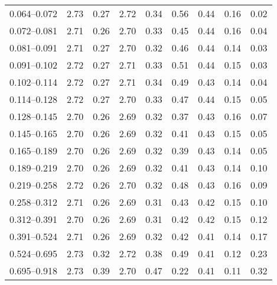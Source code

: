 \begin{table}
\begin{center}
{\begin{tabular}{@{}l l l l l l l l l@{}}
                0.064--0.072    &  2.73   &  0.27   &  2.72         &  0.34      &  0.56    &  0.44  &  0.16       &  0.02  \\
                0.072--0.081    &  2.71   &  0.26   &  2.70         &  0.33      &  0.45    &  0.44  &  0.16       &  0.04  \\
                0.081--0.091    &  2.71   &  0.27   &  2.70         &  0.32      &  0.46    &  0.44  &  0.14       &  0.03  \\
                0.091--0.102    &  2.72   &  0.27   &  2.71         &  0.33      &  0.51    &  0.44  &  0.15       &  0.03  \\
                0.102--0.114    &  2.72   &  0.27   &  2.71         &  0.34      &  0.49    &  0.43  &  0.14       &  0.04  \\
                0.114--0.128    &  2.72   &  0.27   &  2.70         &  0.33      &  0.47    &  0.44  &  0.15       &  0.05  \\
                0.128--0.145    &  2.70   &  0.26   &  2.69         &  0.32      &  0.37    &  0.43  &  0.16       &  0.07  \\
                0.145--0.165    &  2.70   &  0.26   &  2.69         &  0.32      &  0.41    &  0.43  &  0.15       &  0.05  \\
                0.165--0.189    &  2.70   &  0.26   &  2.69         &  0.32      &  0.39    &  0.43  &  0.14       &  0.05  \\
                0.189--0.219    &  2.70   &  0.26   &  2.69         &  0.32      &  0.41    &  0.43  &  0.14       &  0.10  \\
                0.219--0.258    &  2.72   &  0.26   &  2.70         &  0.32      &  0.48    &  0.43  &  0.16       &  0.09  \\
                0.258--0.312    &  2.71   &  0.26   &  2.69         &  0.31      &  0.43    &  0.42  &  0.15       &  0.10  \\
                0.312--0.391    &  2.70   &  0.26   &  2.69         &  0.31      &  0.42    &  0.42  &  0.15       &  0.12  \\
                0.391--0.524    &  2.71   &  0.26   &  2.69         &  0.32      &  0.42    &  0.41  &  0.14       &  0.17  \\
                0.524--0.695    &  2.73   &  0.32   &  2.72         &  0.38      &  0.49    &  0.41  &  0.12       &  0.23  \\
                0.695--0.918    &  2.73   &  0.39   &  2.70         &  0.47      &  0.22    &  0.41  &  0.11       &  0.32  \\

\end{tabular}}
\end{center}
\end{table}
